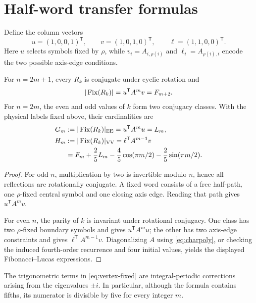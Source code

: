 \section{Half-word transfer formulas}

Define the column vectors
\[
u=(1,0,0,1)^{\mathsf T},\qquad
v=(1,0,1,0)^{\mathsf T},\qquad
\ell=(1,1,0,0)^{\mathsf T}.
\]
Here $u$ selects symbols fixed by $\rho$, while
$v_i=A_{i,\rho(i)}$ and $\ell_i=A_{\rho(i),i}$ encode the two possible
axis-edge conditions.

\begin{theorem}\label{thm:fixed}
For $n=2m+1$, every $R_k$ is conjugate under cyclic rotation and
\begin{equation}\label{eq:odd-fixed}
|\operatorname{Fix}(R_k)|=u^{\mathsf T}A^m v=F_{m+2}.
\end{equation}
For $n=2m$, the even and odd values of $k$ form two conjugacy classes.  With
the physical labels fixed above, their cardinalities are
\begin{align}
G_m&:=|\operatorname{Fix}(R_k)|_{\mathrm{EE}}=u^{\mathsf T}A^m u=L_m,
\label{eq:edge-fixed}\\
H_m&:=|\operatorname{Fix}(R_k)|_{\mathrm{VV}}=\ell^{\mathsf T}A^{m-1}v \notag\\
&=F_m+\frac25L_m-\frac45\cos(\pi m/2)
       -\frac25\sin(\pi m/2).
\label{eq:vertex-fixed}
\end{align}
\end{theorem}

\begin{proof}
For odd $n$, multiplication by two is invertible modulo $n$, hence all
reflections are rotationally conjugate.  A fixed word consists of a free
half-path, one $\rho$-fixed central symbol and one closing axis edge.  Reading
that path gives $u^{\mathsf T}A^m v$.

For even $n$, the parity of $k$ is invariant under rotational conjugacy.
One class has two $\rho$-fixed boundary symbols and gives
$u^{\mathsf T}A^m u$; the other has two axis-edge constraints and gives
$\ell^{\mathsf T}A^{m-1}v$.  Diagonalizing $A$ using
\eqref{eq:charpoly}, or checking the induced fourth-order recurrence and four
initial values, yields the displayed Fibonacci--Lucas expressions.
\end{proof}

The trigonometric terms in \eqref{eq:vertex-fixed} are integral-periodic
corrections arising from the eigenvalues $\pm i$.  In particular, although
the formula contains fifths, its numerator is divisible by five for every
integer $m$.
